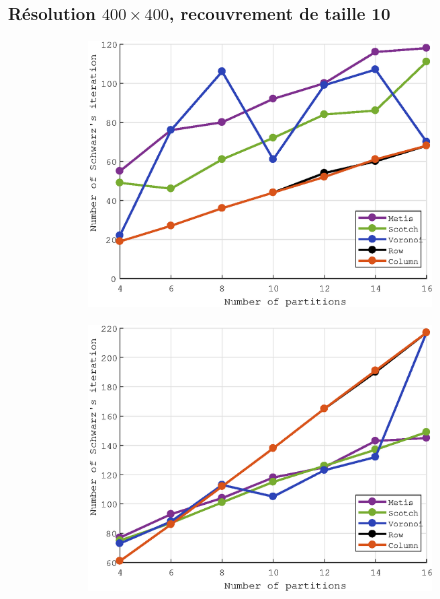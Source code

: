 \documentclass[a4paper,11pt]{article}
\begin{document}
\subsubsection{Résolution $400\times 400$, recouvrement de taille 10}
\begin{figure}[H]
	\centering
	\begin{subfigure}[t]{0.45\textwidth}
		\centering
		\includegraphics[width=\textwidth]{robin_400x400_10_iter.eps}
	\end{subfigure}
	\hfill
	\begin{subfigure}[t]{0.45\textwidth}
		\centering
		\includegraphics[width=\textwidth]{dirichlet_400x400_10_iter.eps}
	\end{subfigure}
\end{figure}
\end{document}
